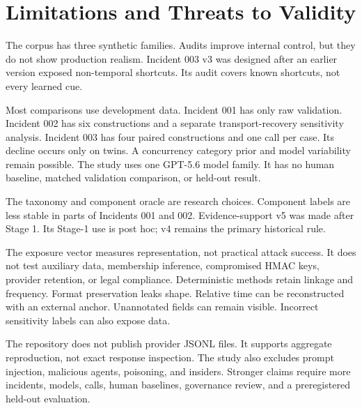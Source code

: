 \section{Limitations and Threats to Validity}
\label{sec:limitations}
The corpus has three synthetic families. Audits improve internal control, but
they do not show production realism. Incident 003 v3 was designed after an
earlier version exposed non-temporal shortcuts. Its audit covers known
shortcuts, not every learned cue.

Most comparisons use development data. Incident 001 has only raw validation.
Incident 002 has six constructions and a separate transport-recovery
sensitivity analysis. Incident 003 has four paired constructions and one call
per case. Its decline occurs only on twins. A concurrency category prior and
model variability remain possible. The study uses one GPT-5.6 model family.
It has no human baseline, matched validation comparison, or held-out result.

The taxonomy and component oracle are research choices. Component labels are
less stable in parts of Incidents 001 and 002. Evidence-support v5 was made
after Stage 1. Its Stage-1 use is post hoc; v4 remains the primary historical
rule.

The exposure vector measures representation, not practical attack success.
It does not test auxiliary data, membership inference, compromised HMAC keys,
provider retention, or legal compliance. Deterministic methods retain linkage
and frequency. Format preservation leaks shape. Relative time can be
reconstructed with an external anchor. Unannotated fields can remain visible.
Incorrect sensitivity labels can also expose data.

The repository does not publish provider JSONL files. It supports aggregate
reproduction, not exact response inspection. The study also excludes prompt
injection, malicious agents, poisoning, and insiders. Stronger claims require
more incidents, models, calls, human baselines, governance review, and a
preregistered held-out evaluation.

